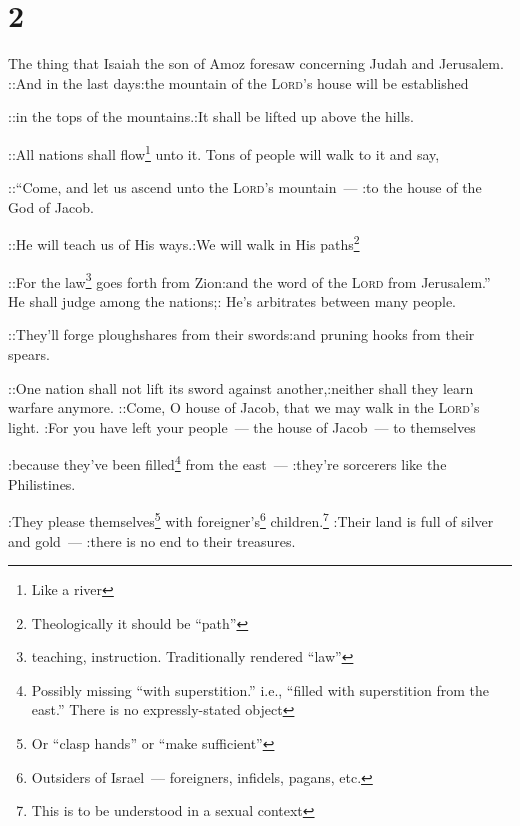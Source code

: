 \section{2}
\begin{enumerate}[align=center]
     The thing that Isaiah the son of Amoz foresaw concerning Judah and Jerusalem.%
     ::And in the last days:the mountain of the \textsc{Lord}'s house will be established%
    
    ::in the tops of the mountains.:It shall be lifted up above the hills.%
    
    ::All nations shall flow\footnote{Like a river} unto it. Tons of people will walk to it and say,%
    
    ::``Come, and let us ascend unto the \textsc{Lord}'s mountain~--- :to the house of the God of Jacob.%
    
    ::He will teach us of His ways.:We will walk in His paths\footnote{Theologically it should be ``path''}%
    
    ::For the law\footnote{teaching, instruction. Traditionally rendered ``law''} goes forth from Zion:and the word of the \textsc{Lord} from Jerusalem.''%
     He shall judge among the nations;: He's arbitrates between many people.%
    
    ::They'll forge ploughshares from their swords:and pruning hooks from their spears.%
    
    ::One nation shall not lift its sword against another,:neither shall they learn warfare anymore.%
     ::Come, O house of Jacob, that we may walk in the \textsc{Lord}'s light.%
     :For you have left your people~--- the house of Jacob~--- to themselves%
    
    :because they've been filled\footnote{Possibly missing ``with superstition.'' i.e., ``filled with superstition from the east.'' There is no expressly-stated object} from the east~--- :they're sorcerers like the Philistines.%
    
    :They please themselves\footnote{Or ``clasp hands'' or ``make sufficient''} with foreigner's\footnote{Outsiders of Israel~--- foreigners, infidels, pagans, etc.} children.\footnote{This is to be understood in a sexual context}%
     :Their land is full of silver and gold~--- :there is no end to their treasures.%
    

\end{enumerate}
